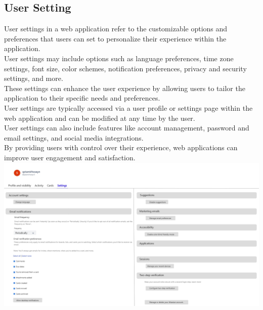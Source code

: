 \subsection{User Setting}

User settings in a web application refer to the customizable options and preferences that users can set to personalize their experience within the application.\\

User settings may include options such as language preferences, time zone settings, font size, color schemes, notification preferences, privacy and security settings, and more.\\

These settings can enhance the user experience by allowing users to tailor the application to their specific needs and preferences.\\

User settings are typically accessed via a user profile or settings page within the web application and can be modified at any time by the user.\\

User settings can also include features like account management, password and email settings, and social media integrations.\\

By providing users with control over their experience, web applications can improve user engagement and satisfaction.\\
\includegraphics[width=\columnwidth]{images/UserSetting.jpg}

